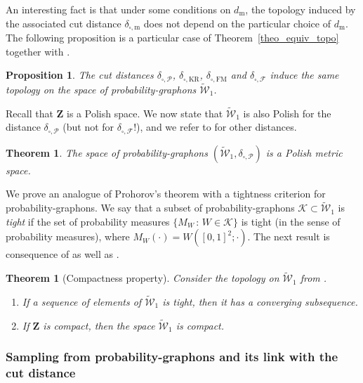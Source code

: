 \documentclass{amsart}
\theoremstyle{plain}
\newtheorem{theo}[Th]{Theorem}
\newtheorem{prop}[Th]{Proposition}
\theoremstyle{definition}
\newcommand{\Space}{\mathbf{Z}}
\newcommand{\cK}{\mathcal{K}}
\newcommand{\UGraphon}{\widetilde{\mathcal{W}}_1}
\newcommand{\m}{\mathrm{m}}
\newcommand{\dmeas}{d_\m}
\newcommand{\ddcut}{\delta_{\square,\m}}
\newcommand{\ddcutF}{\delta_{\square,\mathcal{F}}}
\newcommand{\ddcutP}{\delta_{\square,\mathcal{P}}}
\newcommand{\mKR}{\text{KR}}
\newcommand{\ddcutKR}{\delta_{\square,\mKR}}
\newcommand{\mFM}{\text{FM}}
\newcommand{\ddcutFM}{\delta_{\square,\mFM}}
\begin{document}
An interesting fact is that under some conditions on $\dmeas$,
	the topology induced by the associated cut distance $\ddcut$ does not depend 
		on the particular choice of $\dmeas$.
The following proposition is a particular case of Theorem~\ref{theo_equiv_topo} 
	together with . 

\begin{prop}
	\label{intro:theo_equiv_topo}
The cut distances $\ddcutP$, $\ddcutKR$, $\ddcutFM$ and $\ddcutF$
	induce the same topology on the space of probability-graphons $\UGraphon$.
\end{prop}


  Recall that  $\Space$  is a  Polish
  space. We now  state that $\UGraphon$ is also Polish  for the distance
  $\ddcutP$ (but not for $\ddcutF$!), and we refer to  for other distances.

\begin{theo}\label{intro:theo_complete}
The space of probability-graphons  $(\UGraphon,  \ddcutP)$  is  a  Polish metric  space.
\end{theo}


We prove an analogue of Prohorov's theorem with a tightness criterion for probability-graphons.
We say that a subset of probability-graphons $\cK\subset \UGraphon$ is \emph{tight}
	if the set of probability measures $\{ M_W \,:\, W\in\cK \}$ is tight (in the sense of probability measures),
	where  $M_W(\cdot) =  W([0, 1]^2;\cdot) $. 
The next result is consequence of  as well as .

\begin{theo}[Compactness property]
  	\label{intro:theo_tension_conv}
Consider the topology  on   $\UGraphon$  from .
    \begin{enumerate}[label=(\roman*)]
    \item If a sequence of elements of
      $\UGraphon$ is  tight, 
      then  it has  a converging subsequence.
    \item  If $\Space$  is compact, then the space  $\UGraphon$ is
      compact.
       \end{enumerate}
\end{theo}


\subsubsection{Sampling from probability-graphons and its link with the cut distance}
\end{document}
